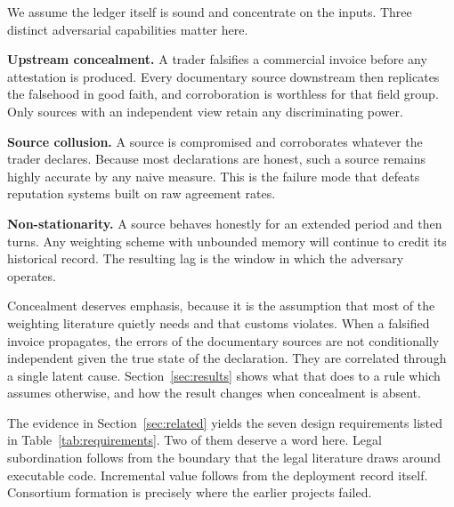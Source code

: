 \documentclass[information,article,submit,moreauthors]{Definitions/mdpi}
\begin{document}
We assume the ledger itself is sound and concentrate on the inputs. Three distinct adversarial capabilities matter here.

\textbf{Upstream concealment.} A trader falsifies a commercial invoice before any attestation is produced. Every documentary source downstream then replicates the falsehood in good faith, and corroboration is worthless for that field group. Only sources with an independent view retain any discriminating power.

\textbf{Source collusion.} A source is compromised and corroborates whatever the trader declares. Because most declarations are honest, such a source remains highly accurate by any naive measure. This is the failure mode that defeats reputation systems built on raw agreement rates.

\textbf{Non-stationarity.} A source behaves honestly for an extended period and then turns. Any weighting scheme with unbounded memory will continue to credit its historical record. The resulting lag is the window in which the adversary operates.

Concealment deserves emphasis, because it is the assumption that most of the weighting literature quietly needs and that customs violates. When a falsified invoice propagates, the errors of the documentary sources are not conditionally independent given the true state of the declaration. They are correlated through a single latent cause. Section~\ref{sec:results} shows what that does to a rule which assumes otherwise, and how the result changes when concealment is absent.

The evidence in Section~\ref{sec:related} yields the seven design requirements listed in Table~\ref{tab:requirements}. Two of them deserve a word here. Legal subordination follows from the boundary that the legal literature draws around executable code. Incremental value follows from the deployment record itself. Consortium formation is precisely where the earlier projects failed.
\end{document}
